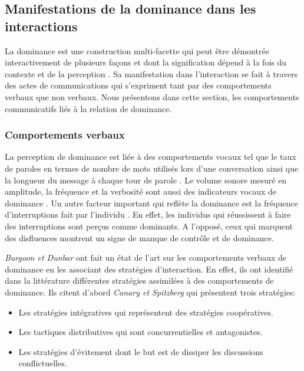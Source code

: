		
	\subsection{Manifestations de la dominance dans les interactions}
	\label{sec:manifesationDom}
		La dominance est une construction multi-facette qui peut être démontrée interactivement de plusieurs façons et dont la signification dépend à la fois du contexte et de la perception \cite{dunbar2005perceptions}. Sa manifestation dans l'interaction se fait à travers des actes de communications qui s'expriment tant par des comportements verbaux que non verbaux.
		Nous présentons dans cette section, les comportements communicatifs liés à la relation de dominance. 
		
		\subsubsection{Comportements verbaux}
			La perception de dominance est liée à des comportements vocaux tel que le taux de paroles en termes de nombre de mots utilisés lors d'une conversation ainsi que la longueur du message à chaque tour de parole \cite{dunbar2005perceptions}. Le volume sonore mesuré en amplitude, la fréquence et la verbosité sont aussi des indicateurs vocaux de dominance \cite{dunbar2005perceptions}. 
			Un autre facteur important qui reflète la dominance est la fréquence d'interruptions fait par l'individu \cite{dunbar2005perceptions,hall2005nonverbal}. En effet, les individus qui réussissent à faire des interruptions sont perçus comme dominants. A l'opposé, ceux qui marquent des disfluences montrent un signe de manque de contrôle et de dominance. 

			\emph{Burgoon et Dunbar} \cite{dunbar2005perceptions} ont fait un état de l'art sur les comportements verbaux de dominance en les associant des stratégies d'interaction. En effet, ils ont identifié dans la littérature différentes stratégies assimilées à des comportements de dominance. Ils citent d'abord \emph{Canary et Spitzberg} \cite{canary1987} qui présentent trois stratégies: 
			\begin{itemize}
				\item Les stratégies intégratives qui représentent des stratégies coopératives.
				\item Les tactiques distributives qui sont concurrentielles et antagonistes.
				\item Les stratégies d'évitement dont le but est de dissiper les discussions conflictuelles. 
			\end{itemize}
			
